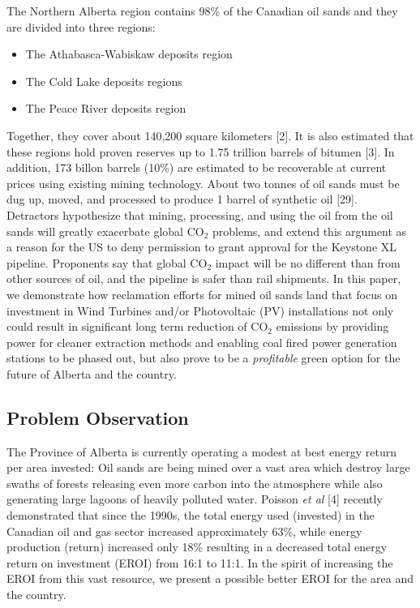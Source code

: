 \documentclass[11pt]{article}
\begin{document}
The Northern Alberta region contains 98\% of the Canadian oil sands and they are divided into three regions:
\begin{itemize}
\item The Athabasca-Wabiskaw deposits region
\item The Cold Lake deposits regions 
\item The Peace River deposits region
\end{itemize}

Together, they cover about 140,200 square kilometers [2]. It is also estimated that these regions hold proven reserves up to 1.75 trillion barrels of bitumen [3]. In addition, 173 billon barrels (10\%) are estimated to be recoverable at current prices using existing mining technology. About two tonnes of oil sands must be dug up, moved, and processed to produce 1 barrel of synthetic oil [29].  \\

Detractors hypothesize that mining, processing, and using the oil from the oil sands will greatly exacerbate global CO$_2$ problems, and extend this argument as a reason for the US to deny permission to grant approval for the Keystone XL pipeline. Proponents say that global CO$_2$ impact will be no different than from other sources of oil, and the pipeline is safer than rail shipments. In this paper, we demonstrate how reclamation efforts for mined oil sands land that focus on investment in Wind Turbines and/or Photovoltaic (PV) installations not only could result in significant long term reduction of CO$_2$ emissions by providing power for cleaner extraction methods and enabling coal fired power generation stations to be phased out, but also prove to be a \emph{profitable} green option for the future of Alberta and the country. 

\subsection{Problem Observation}

The Province of Alberta is currently operating a modest at best energy return per area invested: Oil sands are being mined over a vast area which destroy large swaths of forests releasing even more carbon into the atmosphere while also generating large lagoons of heavily polluted water. Poisson \emph{et al } [4] recently demonstrated that since the 1990s, the total energy used (invested) in the Canadian oil and gas sector increased approximately 63\%, while energy production (return) increased only 18\% resulting in a decreased total energy return on investment (EROI) from 16:1 to 11:1.   In the spirit of increasing the EROI from this vast resource, we present a possible better EROI for the area and the country.  \\
\end{document}
